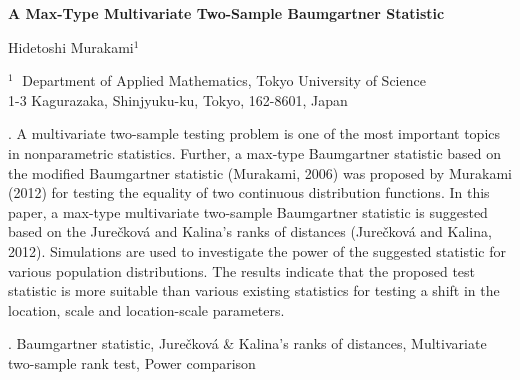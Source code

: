 \documentclass[12pt]{article}
\begin{document}
\begin{flushleft}


{\LARGE\bf A Max-Type Multivariate Two-Sample Baumgartner Statistic}


\vspace{1.0cm}

Hidetoshi Murakami$^1$
\begin{description}

\item $^1 \;$ Department of Applied Mathematics, Tokyo University of Science \\ 1-3 Kagurazaka, Shinjyuku-ku, Tokyo, 162-8601, Japan

\end{description}

\end{flushleft}


\vspace{0.75cm}

. 
A multivariate two-sample testing problem is one of the most important topics in nonparametric statistics. Further, a max-type Baumgartner statistic based on the modified Baumgartner statistic (Murakami, 2006) was proposed by Murakami (2012) for testing the equality of two continuous distribution functions. In this paper, a max-type multivariate two-sample Baumgartner statistic is suggested based on the Jure\v{c}kov\'{a} and Kalina's ranks of distances (Jure\v{c}kov\'{a} and Kalina, 2012). Simulations are used to investigate the power of the suggested statistic for various population distributions. The results indicate that the proposed test statistic is more suitable than various existing statistics for testing a shift in the location, scale and location-scale parameters. 

\vskip 2mm

.
Baumgartner statistic, Jure\v{c}kov\'{a} \& Kalina's ranks of distances, Multivariate two-sample rank test, Power comparison
\end{document}
